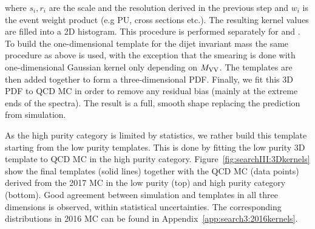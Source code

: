 where $s_{i}, r_{i}$ are the scale and the resolution derived in the previous step and $w_i$ is the event weight product (e.g PU, cross sections etc.). 
The resulting kernel values are filled into a 2D histogram. This procedure is performed separately for \MJO and \MJT. To build the one-dimensional template for the dijet invariant mass the same procedure as above is used, with the exception that
the smearing is done with one-dimensional Gaussian kernel only depending on $M_{\rm VV}$.
The templates are then added together to form a three-dimensional PDF. Finally, we fit this 3D PDF to QCD MC in order to remove any residual bias (mainly at the extreme ends of the spectra). The result is a full, smooth shape replacing the prediction from simulation.\par
As the high purity category is limited by statistics, we rather build this template starting from the low purity templates. This is done by fitting the low purity 3D template to QCD MC in the high purity category. Figure~\ref{fig:searchIII:3Dkernels} show the final templates (solid lines) together with the QCD MC (data points) derived from the 2017 MC in the low purity (top) and high purity category (bottom). Good agreement between simulation and templates in all three dimensions is observed, within statistical uncertainties. The corresponding distributions in 2016 MC can be found in Appendix~\ref{app:search3:2016kernels}.\par
